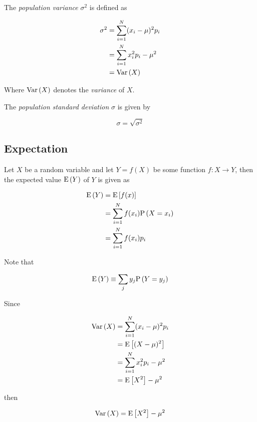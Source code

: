 \begin{definition}
    The \textit{population variance} $\sigma^2$ is defined as
    
    \begin{align}
        \sigma^2
        &= \sum \limits_{i=1}^{N} (x_i - \mu)^2 p_i \\
        &= \sum \limits_{i=1}^{N} x_i^2 p_i - \mu^2 \\
        &= \mathrm{Var} \left( X \right)
    \end{align}
    
    Where $\mathrm{Var} \left( X \right)$ denotes the \textit{variance} of $X$.
\end{definition}

\begin{definition}
    The \textit{population standard deviation} $\sigma$ is given by
    
    \begin{equation}
        \sigma = \sqrt{\sigma^2}
    \end{equation}
\end{definition}

\subsection{Expectation}

\begin{definition}
    Let $X$ be a random variable and let $Y = f(X)$ be some function $f \colon X \to Y$, then the expected value $\mathrm{E} \left( Y \right)$ of $Y$ is given as
    
    \begin{align}
        \mathrm{E} \left( Y \right)
        &= \mathrm{E} \left[ f(x) \right] \\
        &= \sum \limits_{i=1}^{N} f(x_i) \mathrm{P} \left( X = x_i \right) \\
        &= \sum \limits_{i=1}^{N} f(x_i) p_i
    \end{align}
    
    Note that
    
    \begin{equation}
        \mathrm{E} \left( Y \right) \equiv \sum_j y_j \mathrm{P} \left( Y = y_j \right)
    \end{equation}
\end{definition}

\begin{definition}[Variance]
    Since
    
    \begin{align*}
        \mathrm{Var} \left( X \right)
        &= \sum \limits_{i=1}^{N} (x_i - \mu)^2 p_i \\
        &= \mathrm{E} \left[ (X - \mu)^2 \right] \\
        &= \sum \limits_{i=1}^{N} x_i^2 p_i - \mu^2 \\
        &= \mathrm{E} \left[ X^2 \right] - \mu^2
    \end{align*}
    
    then
    
    \begin{equation}
        \mathrm{Var} \left( X \right) = \mathrm{E} \left[ X^2 \right] - \mu^2
    \end{equation}
\end{definition}


